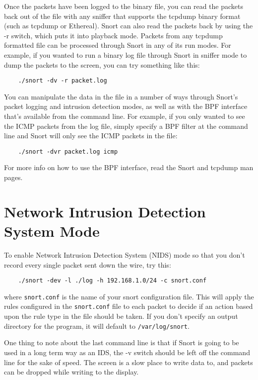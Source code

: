 \documentclass[english]{report}
\begin{document}
Once the packets have been logged to the binary file, you can read the packets
back out of the file with any sniffer that supports the tcpdump binary format
(such as tcpdump or Ethereal). Snort can also read the packets back by using
the -r switch, which puts it into playback mode. Packets from any tcpdump
formatted file can be processed through Snort in any of its run modes. For
example, if you wanted to run a binary log file through Snort in sniffer mode
to dump the packets to the screen, you can try something like this:

\begin{verbatim}
    ./snort -dv -r packet.log
\end{verbatim}

You can manipulate the data in the file in a number of ways through Snort's
packet logging and intrusion detection modes, as well as with the BPF interface
that's available from the command line. For example, if you only wanted to see
the ICMP packets from the log file, simply specify a BPF filter at the command
line and Snort will only see the ICMP packets in the file:

\begin{verbatim}
    ./snort -dvr packet.log icmp 
\end{verbatim}

For more info on how to use the BPF interface, read the Snort and tcpdump man
pages.

\section{Network Intrusion Detection System Mode}

To enable Network Intrusion Detection System (NIDS) mode so that you don't
record every single packet sent down the wire, try this:

\begin{verbatim}
    ./snort -dev -l ./log -h 192.168.1.0/24 -c snort.conf
\end{verbatim}

where \texttt{snort.conf} is the name of your snort configuration file. This will
apply the rules configured in the \verb!snort.conf! file to each packet to decide
if an action based upon the rule type in the file should be taken. If you don't
specify an output directory for the program, it will default to
\verb!/var/log/snort!.

One thing to note about the last command line is that if Snort is going to be
used in a long term way as an IDS, the -v switch should be left off the command
line for the sake of speed.  The screen is a slow place to write data to, and
packets can be dropped while writing to the display.
\end{document}
